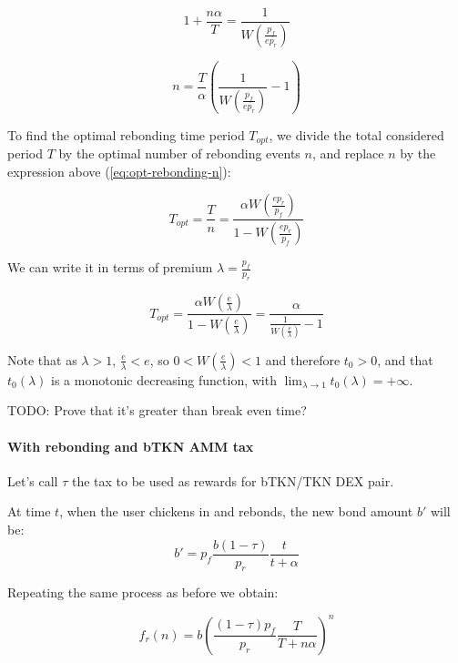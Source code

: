 \documentclass{article}
\begin{document}
\[
1 + \frac{n\alpha}{T} = \frac{1}{W\left(\frac{p_f}{e p_r} \right)}
\]

\begin{equation}
  \label{eq:opt-rebonding-n}
n = \frac{T}{\alpha} \left(\frac{1}{W\left(\frac{p_f}{e p_r} \right)} - 1\right)
\end{equation}

To find the optimal rebonding time period $T_{opt}$, we divide the total considered period $T$ by the optimal number of rebonding events $n$, and replace $n$ by the expression above (\ref{eq:opt-rebonding-n}):

\begin{equation}
  \label{}
T_{opt} = \frac{T}{n} = \frac{\alpha W\left(\frac{e p_r}{p_f}\right)}{1 - W\left(\frac{e p_r}{p_f}\right)}
\end{equation}

We can write it in terms of premium $\lambda = \frac{p_f}{p_r}$

\begin{equation}
  \label{eq:opt-rebonding}
T_{opt} = \frac{\alpha W\left(\frac{e}{\lambda}\right)}{1 - W\left(\frac{e}{\lambda}\right)} = \frac{\alpha}{\frac{1}{W\left(\frac{e}{\lambda}\right)} - 1}
\end{equation}

Note that as $\lambda > 1$, $\frac{e}{\lambda} < e$, so $0 < W(\frac{e}{\lambda}) < 1$ and therefore $t_0 > 0$, and that $t_0(\lambda)$ is a monotonic decreasing function, with $\lim_{\lambda \rightarrow 1}t_0(\lambda) = +\infty$.


TODO: Prove that it’s greater than break even time?

\paragraph{With rebonding and bTKN AMM tax}
Let’s call $\tau$ the tax to be used as rewards for bTKN/TKN DEX pair.

At time $t$, when the user chickens in and rebonds, the new bond amount $b'$ will be:
\begin{equation}
b'= p_f\frac{b(1-\tau)}{p_r}\frac{t}{t+\alpha}
\end{equation}

Repeating the same process as before we obtain:

\begin{equation}
  \label{eq:n-rebond_3}
f_r(n) = b \left(\frac{(1-\tau)p_f}{p_r} \frac{T}{T+n \alpha} \right)^{n}
\end{equation}
\end{document}
